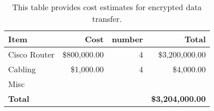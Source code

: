 \tiny \begin{longtable} {|l|r|r|r|} \caption{This table provides cost estimates for encrypted data transfer. \label{tab:ipsec}}\\ 
\hline 
\textbf{Item}&\textbf{Cost}&\textbf{number}&\textbf{Total} \\ \hline
{Cisco Router }&{\$800,000.00}&{4}&{\$3,200,000.00} \\ \hline
{Cabling}&{\$1,000.00}&{4}&{\$4,000.00} \\ \hline
{Misc}&&& \\ \hline
\textbf{Total}&\textbf{}&\textbf{}&\textbf{\$3,204,000.00} \\ \hline
\end{longtable} \normalsize
